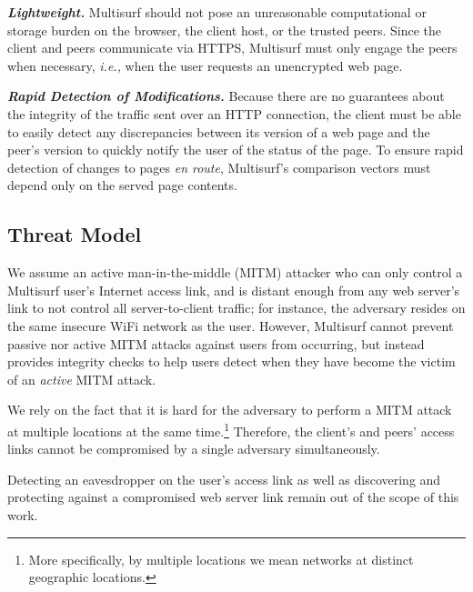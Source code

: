\textbf{\textit{Lightweight.}} Multisurf should not pose an unreasonable computational or storage burden on the browser, the client host, or the trusted peers. 
Since the client and peers communicate via HTTPS, Multisurf must only engage the peers when necessary, \emph{i.e.,} when the user requests an unencrypted web page.

\textbf{\textit{Rapid Detection of Modifications.}} Because there are no guarantees about the integrity of the traffic sent over an HTTP connection, the client must be able to easily detect any discrepancies between its version of a web page and the peer's version to quickly notify the user of the status of the page. 
To ensure rapid detection of changes to pages \emph{en route}, Multisurf's comparison vectors must depend only on the served page contents.

\subsection{Threat Model} 
\label{sec:sec:threat}
We assume an active man-in-the-middle (MITM) attacker who can only control a Multisurf user's Internet access link, and is distant enough from any web server's link to not control all server-to-client traffic; for instance, the adversary resides on the same insecure WiFi network as the user.
However, Multisurf cannot prevent passive nor active MITM attacks against users from occurring, but instead provides integrity checks to help users detect when they have become the victim of an \emph{active} MITM attack. 

We rely on the fact that it is hard for the adversary to perform a MITM attack at multiple locations at the same time.\footnote{More specifically, by multiple locations we mean networks at distinct geographic locations.}
Therefore, the client's and peers' access links cannot be compromised by a single adversary simultaneously.

Detecting an eavesdropper on the user's access link as well as discovering and protecting against a compromised web server link remain out of the scope of this work.